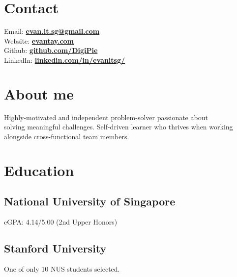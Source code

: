 \documentclass[a4paper]{resume-template} %
\begin{document}
%
%
\lastupdated

%
%
%
%

\begin{minipage}[t]{0.34\textwidth} 


\section{Contact} 
Email: \href{mailto:evan.it.sg@gmail.com}{\bf evan.it.sg@gmail.com} \\
Website: \href{https://www.evantay.com/}{\bf evantay.com} \\
Github: \href{https://github.com/DigiPie}{\bf github.com/DigiPie} \\
LinkedIn:  \href{https://www.linkedin.com/in/evanitsg/}{\bf linkedin.com/in/evanitsg/}
\sectionsep



\section{About me} 
Highly-motivated and independent problem-solver passionate about\\ solving meaningful challenges. Self-driven learner who thrives when working alongside cross-functional team members.
\sectionsep

\section{Education} 
\subsection{National University of Singapore}
cGPA: 4.14/5.00 (2nd Upper Honors)
\sectionsep
\subsection{Stanford University}
One of only 10 NUS students selected.
\sectionsep

\end{minipage}
\end{document}
